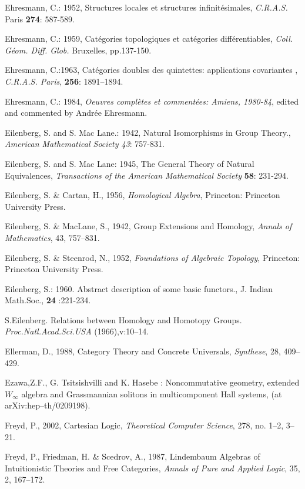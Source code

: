 \documentclass[12pt]{article}
\theoremstyle{plain}
\theoremstyle{definition}
\numberwithin{equation}{section}
\begin{document}
\begin{thebibliography}{199}
Ehresmann, C.: 1952, Structures locales et structures infinit\'esimales, \emph{C.R.A.S.} Paris \textbf{274}: 587-589.

Ehresmann, C.: 1959, Cat\'egories topologiques et cat\'egories diff\'erentiables, \emph{Coll. G\'eom. Diff. Glob.} Bruxelles, pp.137-150.

Ehresmann, C.:1963, Cat\'egories doubles des quintettes: applications covariantes , \emph{C.R.A.S. Paris}, \textbf{256}: 1891--1894.

Ehresmann, C.: 1984, \emph{Oeuvres compl\`etes et  comment\'ees: Amiens, 1980-84}, edited and commented by Andr\'ee Ehresmann.

Eilenberg, S. and S. Mac Lane.: 1942, Natural Isomorphisms in Group Theory., \emph{American Mathematical Society 43}: 757-831.

Eilenberg, S. and S. Mac Lane: 1945, The General Theory of Natural Equivalences, \emph{Transactions of the American Mathematical Society} \textbf{58}: 231-294.

Eilenberg, S. \& Cartan, H., 1956, {\em Homological Algebra}, Princeton: Princeton University Press. 

Eilenberg, S. \& MacLane, S., 1942, Group Extensions and Homology, {\em Annals of Mathematics}, 43, 757--831. 

Eilenberg, S. \& Steenrod, N., 1952, {\em Foundations of Algebraic Topology}, Princeton: Princeton University Press. 

Eilenberg, S.: 1960. Abstract description of some basic functors., J. Indian Math.Soc., \textbf{24} :221-234.

S.Eilenberg. Relations between Homology and Homotopy Groups. {\em Proc.Natl.Acad.Sci.USA} (1966),v:10--14.  

Ellerman, D., 1988, Category Theory and Concrete Universals, {\em Synthese}, 28, 409--429. 

Ezawa,Z.F.,  G. Tsitsishvilli and K. Hasebe : Noncommutative geometry, extended $W_{\infty}$ algebra and Grassmannian solitons in multicomponent Hall systems, (at arXiv:hep--th/0209198).

Freyd, P., 2002, Cartesian Logic, {\em Theoretical Computer Science}, 278, no. 1--2, 3--21.  

Freyd, P., Friedman, H. \& Scedrov, A., 1987, Lindembaum Algebras of Intuitionistic Theories and Free Categories, {\em Annals of Pure and Applied Logic}, 35, 2, 167--172.


\end{thebibliography}
\end{document}
